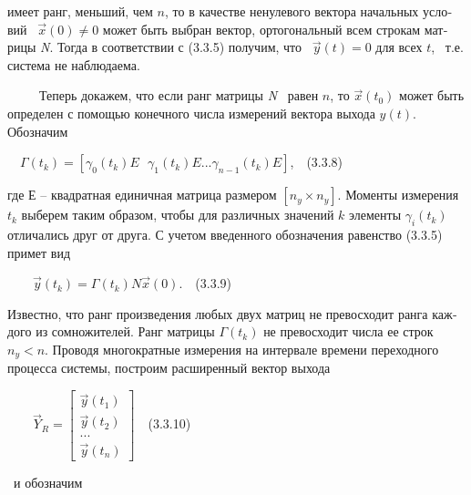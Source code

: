 \documentclass[a4paper]{article}
\begin{document}
{\begin{russian}\sffamily
имеет ранг, меньший, чем  $n$, то в качестве ненулевого вектора начальных условий \  $\vec x(0)\neq 0$ может быть выбран
вектор, ортогональный всем строкам матрицы \textit{N}. Тогда в соответствии с (3.3.5) получим, что \  $\vec y(t)=0$ для
всех  $t$, \ т.е. система не наблюдаема.
\end{russian}}

{\begin{russian}\sffamily
\ \ \ \ \ Теперь докажем, что если ранг матрицы \textit{N }\ равен  $n$, то  $\vec x(t_0)$ может быть определен с
помощью конечного числа измерений вектора выхода  $y(t)$. Обозначим 
\end{russian}}

{\begin{russian}\sffamily
\ \  $Γ(t_k)=\left[γ_0(t_k)E\text{  }γ_1(t_k)E...γ_{n-1}(t_k)E\right]$,\ \ (3.3.8)
\end{russian}}

{\begin{russian}\sffamily
где Е – квадратная единичная матрица размером  $[n_y\times n_y]$. Моменты измерения  $t_k$ выберем таким образом, чтобы
для различных значений  $k$ элементы  $γ_i(t_k)$ отличались друг от друга. С учетом введенного обозначения равенство
(3.3.5) примет вид
\end{russian}}

{\begin{russian}\sffamily
\ \ \ \  $\vec y(t_k)=Γ(t_k)N\vec x(0)$.\ \ (3.3.9)
\end{russian}}

{\begin{russian}\sffamily
Известно, что ранг произведения любых двух матриц не превосходит ранга каждого из сомножителей. Ранг матрицы  $Γ(t_k)$
не превосходит числа ее строк  $n_y<n$. Проводя многократные измерения на интервале времени переходного процесса
системы, построим расширенный вектор выхода \ 
\end{russian}}

{\begin{russian}\sffamily
\ \ \ \  $\vec Y_R=\left[\begin{matrix}\vec y(t_1)\\\vec y(t_2)\\...\\\vec
y(t_n)\end{matrix}\right]$\ \ (3.3.10)\ \ \ \ 
\end{russian}}

{\begin{russian}\sffamily
\ и обозначим
\end{russian}}
\end{document}
